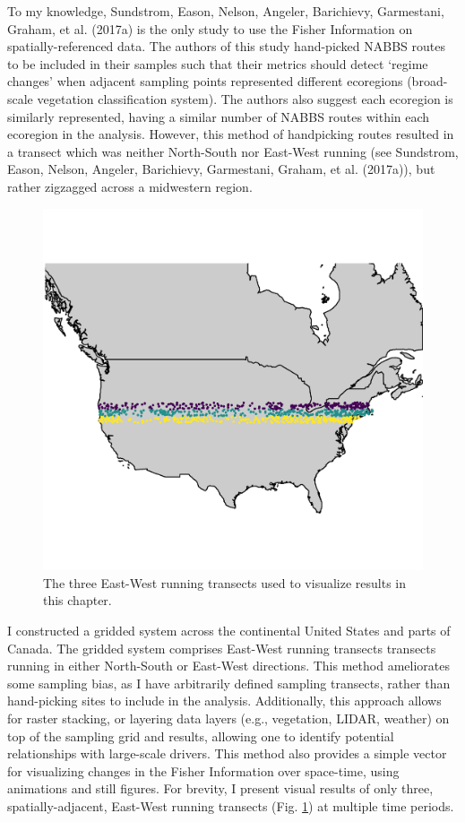 \documentclass[12pt,twoside,openany]{reedthesis}
\begin{document}
To my knowledge, Sundstrom, Eason, Nelson, Angeler, Barichievy, Garmestani, Graham, et al. (2017a) is the only study to use the Fisher Information on spatially-referenced data. The authors of this study hand-picked NABBS routes to be included in their samples such that their metrics should detect `regime changes' when adjacent sampling points represented different ecoregions (broad-scale vegetation classification system). The authors also suggest each ecoregion is similarly represented, having a similar number of NABBS routes within each ecoregion in the analysis. However, this method of handpicking routes resulted in a transect which was neither North-South nor East-West running (see Sundstrom, Eason, Nelson, Angeler, Barichievy, Garmestani, Graham, et al. (2017a)), but rather zigzagged across a midwestern region.
\begin{figure}
\includegraphics[width=0.85\linewidth]{./chapterFiles/fisherSpatial/figures/figsCalledInDiss/transectSamplingALlRoutesUsed} \caption{The three East-West running transects used to visualize results in this chapter.}\label{fig:ewRoutesUsedHere}
\end{figure}
I constructed a gridded system across the continental United States and parts of Canada. The gridded system comprises East-West running transects transects running in either North-South or East-West directions. This method ameliorates some sampling bias, as I have arbitrarily defined sampling transects, rather than hand-picking sites to include in the analysis. Additionally, this approach allows for raster stacking, or layering data layers (e.g., vegetation, LIDAR, weather) on top of the sampling grid and results, allowing one to identify potential relationships with large-scale drivers. This method also provides a simple vector for visualizing changes in the Fisher Information over space-time, using animations and still figures. For brevity, I present visual results of only three, spatially-adjacent, East-West running transects (Fig. \ref{fig:ewRoutesUsedHere}) at multiple time periods.
\end{document}
